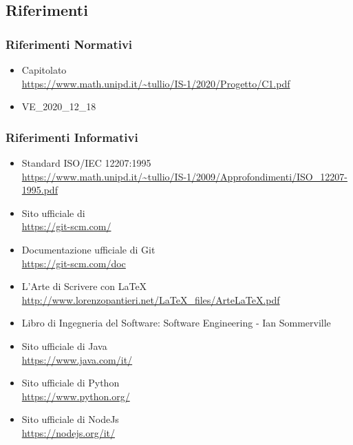 \subsection{Riferimenti}
\subsubsection{Riferimenti Normativi}
\begin{itemize}
\item{Capitolato \\
\url{https://www.math.unipd.it/~tullio/IS-1/2020/Progetto/C1.pdf}}
\item{VE\_2020\_12\_18}
\end{itemize}

\subsubsection{Riferimenti Informativi}
\begin{itemize}
\item{Standard ISO/IEC 12207:1995 \\
\url{https://www.math.unipd.it/~tullio/IS-1/2009/Approfondimenti/ISO_12207-1995.pdf}}
\item{Sito ufficiale di  \\
\url{https://git-scm.com/}}
\item{Documentazione ufficiale di Git} \\
\url{https://git-scm.com/doc}
\item{L’Arte di Scrivere con \LaTeX \\
\url{http://www.lorenzopantieri.net/LaTeX_files/ArteLaTeX.pdf}}
\item{Libro di Ingegneria del Software: Software Engineering - Ian Sommerville}
\item{Sito ufficiale di Java} \\
\url{https://www.java.com/it/}
\item{Sito ufficiale di Python} \\
\url{https://www.python.org/}
\item{Sito ufficiale di NodeJs} \\
\url{https://nodejs.org/it/}
\end{itemize}
